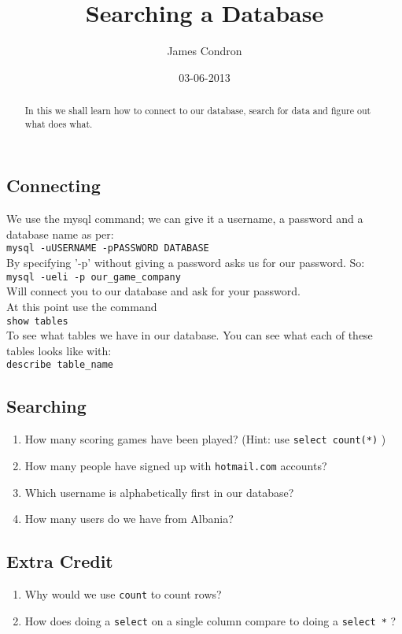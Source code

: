\documentclass[10pt,a4paper]{article}
\begin{document}
\title{Searching a Database}
\author{James Condron}
\date{03-06-2013}
\maketitle

\begin{abstract}
In this we shall learn how to connect to our database, search for data and figure out what does what.
\end{abstract}

\subsection{Connecting}
We use the mysql command; we can give it a username, a password and a database name as per: \\

{\tt mysql -uUSERNAME -pPASSWORD DATABASE } \\

By specifying '-p' without giving a password asks us for our password. So: \\

{\tt mysql -ueli -p our\_game\_company } \\

Will connect you to our database and ask for your password. \\

At this point use the command \\

{\tt show tables } \\

To see what tables we have in our database. You can see what each of these tables looks like with: \\

{\tt describe table\_name } \\

\subsection{Searching}

\begin{enumerate}
\item How many scoring games have been played? (Hint: use  {\tt select count(*)} )
\item How many people have signed up with {\tt hotmail.com} accounts?
\item Which username is alphabetically first in our database?
\item How many users do we have from Albania?
\end{enumerate}


\subsection{Extra Credit}
\begin{enumerate}
\item Why would we use {\tt count} to count rows?
\item How does doing a {\tt select} on a single column compare to doing a {\tt select *} ?
\end{enumerate}
\end{document}
